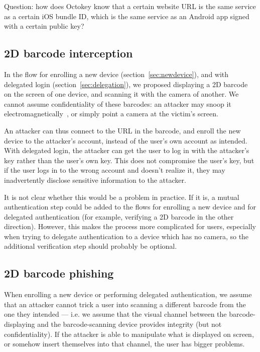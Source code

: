 Question: how does Octokey know that a certain website URL is the same service as a certain iOS
bundle ID, which is the same service as an Android app signed with a certain public key?

\subsection{2D barcode interception}\label{sec:barcode-intercept}

In the flow for enrolling a new device (section~\ref{sec:newdevice}), and with delegated login
(section~\ref{sec:delegation}), we proposed displaying a 2D barcode on the screen of one device, and
scanning it with the camera of another. We cannot assume confidentiality of these barcodes: an
attacker may snoop it electromagnetically~\cite{Kuhn05}, or simply point a camera at the victim's
screen.

An attacker can thus connect to the URL in the barcode, and enroll the new device to the attacker's
account, instead of the user's own account as intended. With delegated login, the attacker can get
the user to log in with the attacker's key rather than the user's own key. This does not compromise
the user's key, but if the user logs in to the wrong account and doesn't realize it, they may
inadvertently disclose sensitive information to the attacker.

It is not clear whether this would be a problem in practice. If it is, a mutual authentication step
could be added to the flows for enrolling a new device and for delegated authentication (for
example, verifying a 2D barcode in the other direction). However, this makes the process more
complicated for users, especially when trying to delegate authentication to a device which has no
camera, so the additional verification step should probably be optional.

\subsection{2D barcode phishing}\label{sec:barcode-phishing}

When enrolling a new device or performing delegated authentication, we assume that an attacker
cannot trick a user into scanning a different barcode from the one they intended --- i.e. we assume
that the visual channel between the barcode-displaying and the barcode-scanning device provides
integrity (but not confidentiality). If the attacker is able to manipulate what is displayed on
screen, or somehow insert themselves into that channel, the user has bigger problems.

